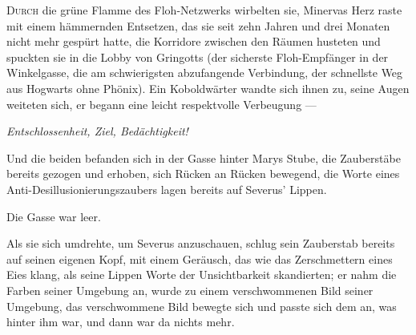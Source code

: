 
\lettrine{D}{urch} die grüne Flamme des Floh-Netzwerks wirbelten sie, Minervas Herz raste mit einem hämmernden Entsetzen, das sie seit zehn Jahren und drei Monaten nicht mehr gespürt hatte, die Korridore zwischen den Räumen husteten und spuckten sie in die Lobby von Gringotts (der sicherste Floh-Empfänger in der Winkelgasse, die am schwierigsten abzufangende Verbindung, der schnellste Weg aus Hogwarts ohne Phönix). Ein Koboldwärter wandte sich ihnen zu, seine Augen weiteten sich, er begann eine leicht respektvolle Verbeugung —

\emph{Entschlossenheit, Ziel, Bedächtigkeit!}

Und die beiden befanden sich in der Gasse hinter Marys Stube, die Zauberstäbe bereits gezogen und erhoben, sich Rücken an Rücken bewegend, die Worte eines Anti-Desillusionierungszaubers lagen bereits auf Severus’ Lippen.

Die Gasse war leer.

Als sie sich umdrehte, um Severus anzuschauen, schlug sein Zauberstab bereits auf seinen eigenen Kopf, mit einem Geräusch, das wie das Zerschmettern eines Eies klang, als seine Lippen Worte der Unsichtbarkeit skandierten; er nahm die Farben seiner Umgebung an, wurde zu einem verschwommenen Bild seiner Umgebung, das verschwommene Bild bewegte sich und passte sich dem an, was hinter ihm war, und dann war da nichts mehr.

